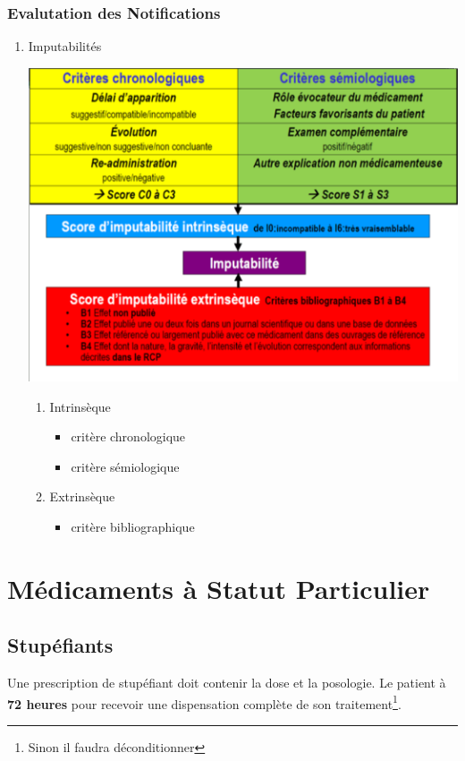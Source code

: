 \documentclass[11pt]{article}
\begin{document}
\subsubsection{Evalutation des Notifications}
\label{sec:orgb7bf1fe}
\begin{enumerate}
\item Imputabilités
\label{sec:org1f763bb}
\begin{center}
\includegraphics[width=.9\linewidth]{./imputabilite.png}
\end{center}
\begin{enumerate}
\item Intrinsèque
\label{sec:orga3199b4}
\begin{itemize}
\item critère chronologique
\item critère sémiologique
\end{itemize}
\item Extrinsèque
\label{sec:org70b6752}
\begin{itemize}
\item critère bibliographique
\end{itemize}
\end{enumerate}
\end{enumerate}
\section{Médicaments à Statut Particulier}
\label{sec:org7aa9080}
\setlength{\parindent}{0pt}

\subsection{Stupéfiants}
\label{sec:orge009701}
Une prescription de stupéfiant doit contenir la dose et la posologie.
Le patient à \textbf{72 heures} pour recevoir une dispensation complète de son traitement\footnote{Sinon il faudra déconditionner}.
\end{document}
